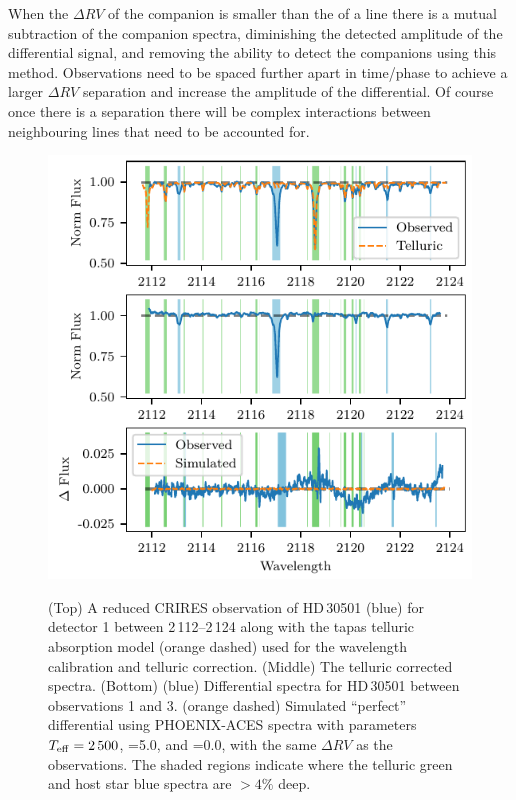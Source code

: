 When the \(\Delta {RV}\) of the companion is smaller than the {\fwhm} of a line there is a mutual subtraction of the companion spectra, diminishing the detected amplitude of the differential signal, and removing the ability to detect the companions using this method.
Observations need to be spaced further apart in time/phase to achieve a larger \(\Delta {RV}\) separation and increase the amplitude of the differential.
Of course once there is a separation there will be complex interactions between neighbouring lines that need to be accounted for.

\begin{figure}
    \centering
    \includegraphics[width=0.8\hsize]{figures/direct-recovery/differential.pdf}\\
    \caption{(Top) A reduced {CRIRES} observation of {HD\,30501} (blue) for detector 1 between 2\,112--2\,124\nm{} along with the tapas telluric absorption model ({orange} dashed) used for the wavelength calibration and telluric correction.
        (Middle) The telluric corrected spectra.
        (Bottom) ({blue}) Differential spectra for {HD\,30501} between observations 1 and 3. ({orange} dashed) Simulated ``perfect'' differential using {PHOENIX-ACES} spectra with parameters \(T_{\mathrm{eff}}{}=2\,500\)\K{}, \logg{}=5.0, and \feh{}=0.0, with the same \(\Delta {RV}\) as the observations.
        The shaded regions indicate where the telluric {green} and host star {blue} spectra are \(> 4\%\) deep.}
    \label{fig:spectral_example}
\end{figure}


